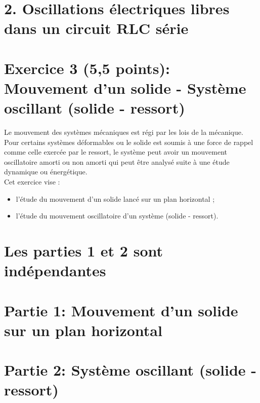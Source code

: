 \section*{2. Oscillations électriques libres dans un circuit $\boldsymbol{R} \boldsymbol{L} \boldsymbol{C}$ série}


\section*{Exercice 3 (5,5 points): Mouvement d'un solide - Système oscillant (solide - ressort)}
Le mouvement des systèmes mécaniques est régi par les lois de la mécanique. Pour certains systèmes déformables ou le solide est soumis à une force de rappel comme celle exercée par le ressort, le système peut avoir un mouvement oscillatoire amorti ou non amorti qui peut être analysé suite à une étude dynamique ou énergétique.\\
Cet exercice vise :

\begin{itemize}
  \item l'étude du mouvement d'un solide lancé sur un plan horizontal ;
  \item l'étude du mouvement oscillatoire d'un système (solide - ressort).
\end{itemize}

\section*{Les parties 1 et 2 sont indépendantes}
\section*{Partie 1: Mouvement d'un solide sur un plan horizontal}


\section*{Partie 2: Système oscillant (solide - ressort)}

